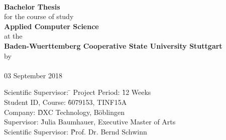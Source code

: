 \begin{titlepage}

\begin{minipage}{\textwidth}
		\vspace{-2cm}
		\noindent
		\hfill
\end{minipage}

\enlargethispage{20mm}

\sffamily
\begin{center}
    \vspace*{24mm}  {\large\textbf{\dertitel}}       \\
    \vspace*{12mm}  {\large\textbf{Bachelor Thesis}}        \\
    \vspace*{24mm}   for the course of study         \\
    \vspace*{3mm}   {\large\textbf{Applied Computer Science}} \\
    \vspace*{3mm}   at the                         \\
    \vspace*{3mm}   {\large\textbf{Baden-Wuerttemberg Cooperative State University Stuttgart}}  \\
    \vspace*{12mm}  by                              \\
    \vspace*{3mm}   {\large\textbf{\derautor}}      \\
    \vspace*{12mm}  03 September 2018 \\

\vfill

\begin{minipage}{\textwidth}

\begin{tabbing}
	Scientific Supervisor: \hspace{1.85cm} \= \kill
	Project Period: \` 12 Weeks \\[1.5mm]
	Student ID, Course: \` 6079153, TINF15A\\[1.5mm]
	Company: \` DXC Technology, Böblingen\\[1.5mm]
	Supervisor: \` Julia Baumhauer, Executive Master of Arts\\[1.5mm]
	Scientific Supervisor: \` Prof. Dr. Bernd Schwinn \\[1.5mm]

\end{tabbing}
\end{minipage}

\end{center}

\end{titlepage}
